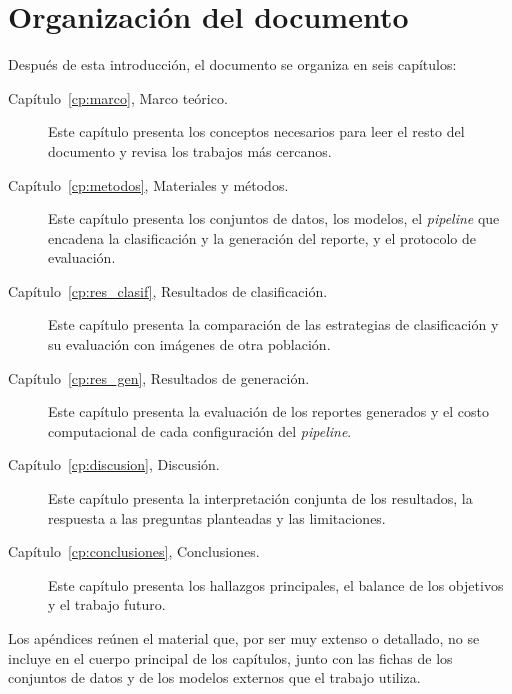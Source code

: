 \section{Organización del documento}
\label{sec:intro_organizacion}
Después de esta introducción, el documento se organiza en seis capítulos:

\begin{description}
  \item[Capítulo~\ref{cp:marco}, Marco teórico.] Este capítulo presenta los conceptos necesarios para leer el
  resto del documento y revisa los trabajos más cercanos.
  \item[Capítulo~\ref{cp:metodos}, Materiales y métodos.] Este capítulo presenta los conjuntos de datos, los
  modelos, el \emph{pipeline} que encadena la clasificación y la generación del reporte, y el protocolo de
  evaluación.
  \item[Capítulo~\ref{cp:res_clasif}, Resultados de clasificación.] Este capítulo presenta la comparación de las
  estrategias de clasificación y su evaluación con imágenes de otra población.
  \item[Capítulo~\ref{cp:res_gen}, Resultados de generación.] Este capítulo presenta la evaluación de los
  reportes generados y el costo computacional de cada configuración del \emph{pipeline}.
  \item[Capítulo~\ref{cp:discusion}, Discusión.] Este capítulo presenta la interpretación conjunta de los
  resultados, la respuesta a las preguntas planteadas y las limitaciones.
  \item[Capítulo~\ref{cp:conclusiones}, Conclusiones.] Este capítulo presenta los hallazgos principales, el
  balance de los objetivos y el trabajo futuro.
\end{description}

Los apéndices reúnen el material que, por ser muy extenso o detallado, no se incluye en el cuerpo principal de
los capítulos, junto con las fichas de los conjuntos de datos y de los modelos externos que el trabajo utiliza.
